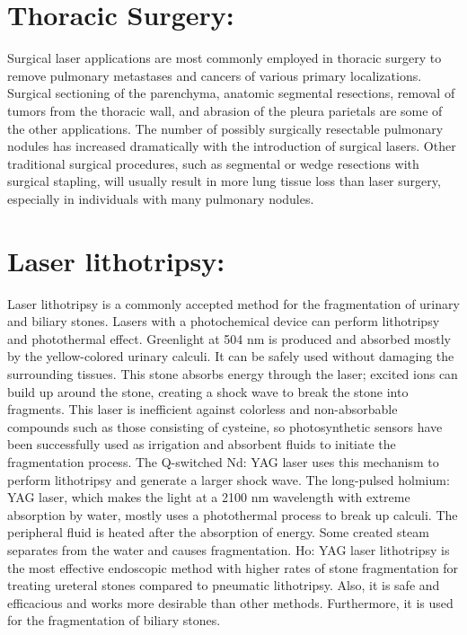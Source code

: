\documentclass[12pt]{article}
\begin{document}
\section{Thoracic Surgery:}

\hspace{2.5cm} Surgical laser applications are most commonly employed in thoracic surgery to remove pulmonary metastases and cancers of various primary localizations. Surgical sectioning of the parenchyma, anatomic segmental resections, removal of tumors from the thoracic wall, and abrasion of the pleura parietals are some of the other applications. The number of possibly surgically resectable pulmonary nodules has increased dramatically with the introduction of surgical lasers. Other traditional surgical procedures, such as segmental or wedge resections with surgical stapling, will usually result in more lung tissue loss than laser surgery, especially in individuals with many pulmonary nodules.\\
\section{Laser lithotripsy:}

\hspace{2.5cm} Laser lithotripsy is a commonly accepted method for the fragmentation of urinary and biliary stones. Lasers with a photochemical device can perform lithotripsy and photothermal effect. Greenlight at 504 nm is produced and absorbed mostly by the yellow-colored urinary calculi. It can be safely used without damaging the surrounding tissues. This stone absorbs energy through the laser; excited ions can build up around the stone, creating a shock wave to break the stone into fragments. This laser is inefficient against colorless and non-absorbable compounds such as those consisting of cysteine, so photosynthetic sensors have been successfully used as irrigation and absorbent fluids to initiate the fragmentation process. The Q-switched Nd: YAG laser uses this mechanism to perform lithotripsy and generate a larger shock wave. The long-pulsed holmium: YAG laser, which makes the light at a 2100 nm wavelength with extreme absorption by water, mostly uses a photothermal process to break up calculi. The peripheral fluid is heated after the absorption of energy. Some created steam separates from the water and causes fragmentation.  Ho: YAG laser lithotripsy is the most effective endoscopic method with higher rates of stone fragmentation for treating ureteral stones compared to pneumatic lithotripsy. Also, it is safe and efficacious and works more desirable than other methods. Furthermore, it is used for the fragmentation of biliary stones.
\end{document}
